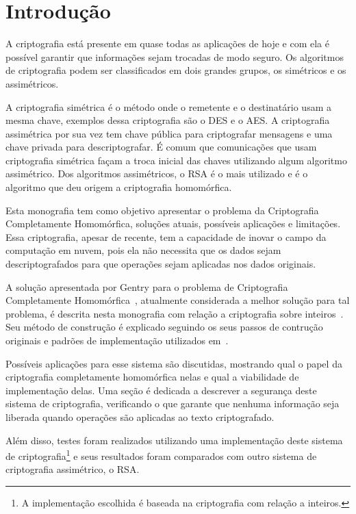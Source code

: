 \chapter{Introdução}
\label{introducao}
A criptografia está presente em quase todas as aplicações de hoje e com ela é possível garantir que informações sejam trocadas de modo seguro. Os algoritmos de criptografia podem ser classificados em dois grandes grupos, os simétricos e os assimétricos.

A criptografia simétrica é o método onde o remetente e o destinatário usam a mesma chave, exemplos dessa criptografia são o DES e o AES. A criptografia assimétrica por sua vez tem chave pública para criptografar mensagens e uma chave privada para descriptografar. É comum que comunicações que usam criptografia simétrica façam a troca inicial das chaves utilizando algum algoritmo assimétrico. Dos algoritmos assimétricos, o RSA é o mais utilizado e é o algoritmo que deu origem a criptografia homomórfica.

Esta monografia tem como objetivo apresentar o problema da Criptografia Completamente Homomórfica, soluções atuais, possíveis aplicações e limitações.
Essa criptografia, apesar de recente, tem a capacidade de inovar o campo da computação em nuvem, pois ela não necessita que os dados sejam descriptografados para que operações sejam aplicadas nos dados originais.

A solução apresentada por Gentry para o problema de Criptografia Completamente Homomórfica~\cite{gentrythesis}, atualmente considerada a melhor solução para tal problema, é descrita nesta monografia com relação a criptografia sobre inteiros~\cite{fheintegers}. Seu método de construção é explicado seguindo os seus passos de contrução originais e padrões de implementação utilizados em~\cite{gentryhalevi}.

Possíveis aplicações para esse sistema são discutidas, mostrando qual o papel da criptografia completamente homomórfica nelas e qual a viabilidade de implementação delas.
Uma seção é dedicada a descrever a segurança deste sistema de criptografia, verificando o que garante que nenhuma informação seja liberada quando operações são aplicadas ao texto criptografado.

Além disso, testes foram realizados utilizando uma implementação deste sistema de criptografia\footnote{A implementação escolhida é baseada na criptografia com relação a inteiros.} e seus resultados foram comparados com outro sistema de criptografia assimétrico, o RSA.

